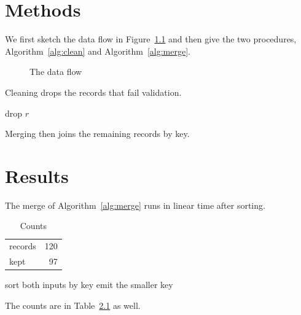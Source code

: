 \documentclass{report}
\begin{document}
\chapter{Methods}
We first sketch the data flow in Figure~\ref{fig:flow} and then give the two procedures, Algorithm~\ref{alg:clean} and Algorithm~\ref{alg:merge}.

\begin{figure}[p]
\centering
\vspace{3cm}
\caption{The data flow}
\label{fig:flow}
\end{figure}
Cleaning drops the records that fail validation.

\begin{algorithm}
\caption{Cleaning}
\label{alg:clean}
\begin{algorithmic}[1]
   \State drop $r$ \EndIf
\EndFor
\end{algorithmic}
\end{algorithm}
Merging then joins the remaining records by key.

\chapter{Results}
The merge of Algorithm~\ref{alg:merge} runs in linear time after sorting.

\begin{table}[h]
\centering
\begin{tabular}{lr}
records & 120 \\
kept & 97 \\
\end{tabular}
\caption{Counts}
\label{tab:counts}
\end{table}
\begin{algorithm}
\caption{Merging}
\label{alg:merge}
\begin{algorithmic}
\State sort both inputs by key
  \State emit the smaller key
\EndWhile
\end{algorithmic}
\end{algorithm}
The counts are in Table~\ref{tab:counts} as well.
\end{document}
